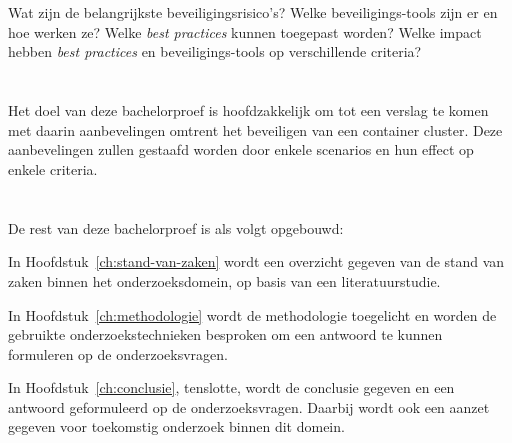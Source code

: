\section{}
\label{sec:onderzoeksvraag}


Wat zijn de belangrijkste beveiligingsrisico's? Welke beveiligings-tools zijn er en hoe werken ze? Welke \textit{best practices} kunnen toegepast worden? Welke impact hebben \textit{best practices} en beveiligings-tools op verschillende criteria?

\section{}
\label{sec:onderzoeksdoelstelling}


Het doel van deze bachelorproef is hoofdzakkelijk om tot een verslag te komen met daarin aanbevelingen omtrent het beveiligen van een container cluster. Deze aanbevelingen zullen gestaafd worden door enkele scenarios en hun effect op enkele criteria.

\section{}
\label{sec:opzet-bachelorproef}


De rest van deze bachelorproef is als volgt opgebouwd:

In Hoofdstuk~\ref{ch:stand-van-zaken} wordt een overzicht gegeven van de stand van zaken binnen het onderzoeksdomein, op basis van een literatuurstudie.

In Hoofdstuk~\ref{ch:methodologie} wordt de methodologie toegelicht en worden de gebruikte onderzoekstechnieken besproken om een antwoord te kunnen formuleren op de onderzoeksvragen.


In Hoofdstuk~\ref{ch:conclusie}, tenslotte, wordt de conclusie gegeven en een antwoord geformuleerd op de onderzoeksvragen. Daarbij wordt ook een aanzet gegeven voor toekomstig onderzoek binnen dit domein.